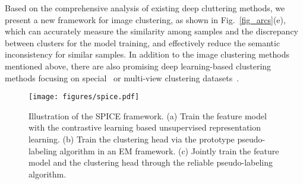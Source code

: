\documentclass[journal]{IEEEtran}
\begin{document}
Based on the comprehensive analysis of existing deep cluttering methods, we present a new framework for image clustering, as shown in Fig.~\ref{fig_arcs}(e), which can accurately measure the similarity among samples and the discrepancy between clusters for the model training, and effectively reduce the semantic inconsistency for similar samples.
In addition to the image clustering methods mentioned above, there are also  promising deep learning-based clustering methods focusing on special~\cite{TIP4, TIP5} or multi-view clustering datasets~\cite{TIP2, TIP3}.

\begin{figure*}[bt!]
    \centering
    \texttt{[image: figures/spice.pdf]}
    \caption{Illustration of the SPICE framework. (a) Train the feature model with the contrastive learning based unsupervised representation learning. (b) Train the clustering head via the prototype pseudo-labeling algorithm in an EM framework. (c) Jointly train the feature model and the clustering head through the reliable pseudo-labeling algorithm.}
    \label{fig_framework}
\end{figure*}
\end{document}

